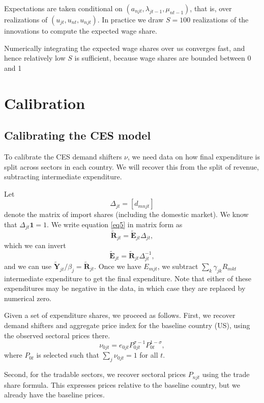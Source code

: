 \documentclass[12pt]{article}
\begin{document}
Expectations are taken conditional on $(a_{njt}, \lambda_{jt-1}, \mu_{nt-1})$, that is, over realizations of $(u_{jt}, u_{nt}, u_{njt})$. In practice we draw $S=100$ realizations of the innovations to compute the expected wage share. 

Numerically integrating the expected wage shares over $u$s converges fast, and hence relatively low $S$ is sufficient, because wage shares are bounded between 0 and 1

\section{Calibration}
\subsection{Calibrating the CES model}
To calibrate the CES demand shifters $\nu$, we need data on how final expenditure is split across sectors in each country. We will recover this from the split of revenue, subtracting intermediate expenditure.

Let
\[
\Delta_{jt} = [d_{mnjt}] 
\]
denote the matrix of import shares (including the domestic market). We know that $\Delta_{jt}\mathbf 1=1$. We write equation \eqref{eq5} in matrix form as
\begin{equation}
	\tilde {\mathbf R}_{jt} = \tilde {\mathbf E}_{jt}\Delta_{jt},
\end{equation}
which we can invert
\begin{equation}
	\tilde {\mathbf E}_{jt} = \tilde {\mathbf R}_{jt}\Delta_{jt}^{-1},
	\end{equation}
and we can use $\tilde {\mathbf Y}_{jt}/\beta_j = \tilde{\mathbf R}_{jt}$. Once we have $E_{mjt}$, we subtract $\sum_k\gamma_{jk}R_{mkt}$ intermediate expenditure to get the final expenditure. Note that either of these expenditures may be negative in the data, in which case they are replaced by numerical zero.

Given a set of expenditure shares, we proceed as follows. First, we recover demand shifters and aggregate price index for the baseline country (US), using the observed sectoral prices there.
\[
\nu_{0jt} = e_{0jt} P_{0jt}^{\sigma-1} P_{0t}^{1-\sigma},
\]
where $P_{0t}$ is selected such that $\sum_j \nu_{0jt}=1$ for all $t$.

Second, for the tradable sectors, we recover sectoral prices $P_{njt}$ using the trade share formula. This expresses prices relative to the baseline country, but we already have the baseline prices.
\end{document}
